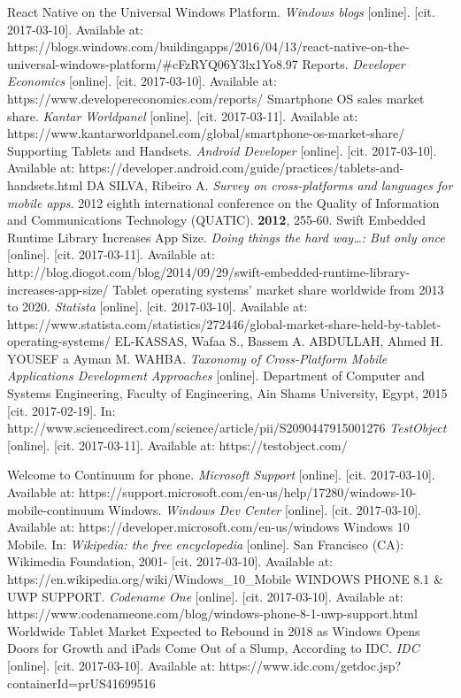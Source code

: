 \documentclass[english,master,public,dept460,male,cpdeclaration,oneside]{diploma}
\begin{document}
\begin{thebibliography}{99}
	 React Native on the Universal Windows Platform. \textit{Windows blogs} [online]. [cit. 2017-03-10]. Available at: https://blogs.windows.com/buildingapps/2016/04/13/react-native-on-the-universal-windows-platform/\#cFzRYQ06Y3lx1Yo8.97
	 Reports. \textit{Developer Economics} [online]. [cit. 2017-03-10]. Available at: https://www.developereconomics.com/reports/
	 Smartphone OS sales market share. \textit{Kantar Worldpanel} [online]. [cit. 2017-03-11]. Available at: https://www.kantarworldpanel.com/global/smartphone-os-market-share/
	 Supporting Tablets and Handsets. \textit{Android Developer} [online]. [cit. 2017-03-10]. Available at: https://developer.android.com/guide/practices/tablets-and-handsets.html
	 DA SILVA, Ribeiro A. \textit{Survey on cross-platforms and languages for mobile apps}. 2012 eighth international conference on the Quality of Information and Communications Technology (QUATIC). \textbf{2012}, 255-60.
	 Swift Embedded Runtime Library Increases App Size. \textit{Doing things the hard way…: But only once} [online]. [cit. 2017-03-11]. Available at: http://blog.diogot.com/blog/2014/09/29/swift-embedded-runtime-library-increases-app-size/
	 Tablet operating systems' market share worldwide from 2013 to 2020. \textit{Statista} [online]. [cit. 2017-03-10]. Available at: https://www.statista.com/statistics/272446/global-market-share-held-by-tablet-operating-systems/
	EL-KASSAS, Wafaa S., Bassem A. ABDULLAH, Ahmed H. YOUSEF a Ayman M. WAHBA. \textit{Taxonomy of Cross-Platform Mobile Applications Development Approaches} [online]. Department of Computer and Systems Engineering, Faculty of Engineering, Ain Shams University, Egypt, 2015 [cit. 2017-02-19]. In: http://www.sciencedirect.com/science/article/pii/S2090447915001276
	 \textit{TestObject} [online]. [cit. 2017-03-11]. Available at: https://testobject.com/
		
	 Welcome to Continuum for phone. \textit{Microsoft Support} [online]. [cit. 2017-03-10]. Available at: https://support.microsoft.com/en-us/help/17280/windows-10-mobile-continuum	
	 Windows. \textit{Windows Dev Center} [online]. [cit. 2017-03-10]. Available at: https://developer.microsoft.com/en-us/windows
	 Windows 10 Mobile. In: \textit{Wikipedia: the free encyclopedia} [online]. San Francisco (CA): Wikimedia Foundation, 2001- [cit. 2017-03-10]. Available at: https://en.wikipedia.org/wiki/Windows\_10\_Mobile					
	 WINDOWS PHONE 8.1 \& UWP SUPPORT. \textit{Codename One} [online]. [cit. 2017-03-10]. Available at: https://www.codenameone.com/blog/windows-phone-8-1-uwp-support.html
	 Worldwide Tablet Market Expected to Rebound in 2018 as Windows Opens Doors for Growth and iPads Come Out of a Slump, According to IDC. \textit{IDC} [online]. [cit. 2017-03-10]. Available at: https://www.idc.com/getdoc.jsp?containerId=prUS41699516
\end{thebibliography}
\end{document}
